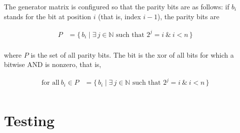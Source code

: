 \documentclass[11pt, oneside]{article}   	%
\begin{document}
The generator matrix is configured so that the parity bits are as follows: if $b_i$ stands for the bit at position $i$ (that is, index $i-1$), the parity bits are 

\begin{align*}
P &= \{\,b_i \mid \exists \, j \in \mathbb{N} \text{ such that } 2^j = i \ \& \ i < n \, \} &\\
\end{align*}

where $P$ is the set of all parity bits. The bit is the xor of all bits for which a bitwise AND is nonzero, that is,

\begin{align*}
\text{for all}\ b_i \in P&= \{\,b_i \mid \exists \, j \in \mathbb{N} \text{ such that } 2^j = i \ \& \ i < n \, \} &\\
\end{align*}

\section*{Testing}
\end{document}
